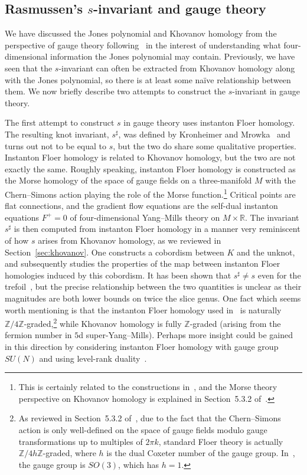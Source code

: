 \documentclass[11pt]{article}
\numberwithin{equation}{section}
\begin{document}
\subsection{Rasmussen's $s$-invariant and gauge theory}
We have discussed the Jones polynomial and Khovanov homology from the perspective of gauge theory following~\cite{Witten:2011zz} in the interest of understanding what four-dimensional information the Jones polynomial may contain.
Previously, we have seen that the $s$-invariant can often be extracted from Khovanov homology along with the Jones polynomial, so there is at least some na\"ive relationship between them.
We now briefly describe two attempts to construct the $s$-invariant in gauge theory.

The first attempt to construct $s$ in gauge theory uses instanton Floer homology.
The resulting knot invariant, $s^\sharp$, was defined by Kronheimer and Mrowka~\cite{kronheimer2013} and turns out not to be equal to $s$, but the two do share some qualitative properties.
Instanton Floer homology is related to Khovanov homology, but the two are not exactly the same.
Roughly speaking, instanton Floer homology is constructed as the Morse homology of the space of gauge fields on a three-manifold $M$ with the Chern--Simons action playing the role of the Morse function.\footnote{
This is certainly related to the constructions in~\cite{Witten:2011zz}, and the Morse theory perspective on Khovanov homology is explained in Section~5.3.2 of~\cite{Witten:2011zz}.}
Critical points are flat connections, and the gradient flow equations are the self-dual instanton equations $F^+ = 0$ of four-dimensional Yang--Mills theory on $M \times \mathbb{R}$.
The invariant $s^\sharp$ is then computed from instanton Floer homology in a manner very reminiscent of how $s$ arises from Khovanov homology, as we reviewed in Section~\ref{sec:khovanov}.
One constructs a cobordism between $K$ and the unknot, and subsequently studies the properties of the map between instanton Floer homologies induced by this cobordism.
It has been shown that $s^\sharp \neq s$ even for the trefoil~\cite{kronheimer2013}, but the precise relationship between the two quantities is unclear as their magnitudes are both lower bounds on twice the slice genus.
One fact which seems worth mentioning is that the instanton Floer homology used in~\cite{kronheimer2013} is naturally $\mathbb{Z}/4\mathbb{Z}$-graded,\footnote{
As reviewed in Section~5.3.2 of~\cite{Witten:2011zz}, due to the fact that the Chern--Simons action is only well-defined on the space of gauge fields modulo gauge transformations up to multiples of $2\pi k$, standard Floer theory is actually $\mathbb{Z}/4h \mathbb{Z}$-graded, where $h$ is the dual Coxeter number of the gauge group.
In~\cite{kronheimer2013}, the gauge group is $SO(3)$, which has $h=1$.} while Khovanov homology is fully $\mathbb{Z}$-graded (arising from the fermion number in $5$d super-Yang--Mills).
Perhaps more insight could be gained in this direction by considering instanton Floer homology with gauge group $SU(N)$ and using level-rank duality~\cite{Naculich:1990pa}.
\end{document}

